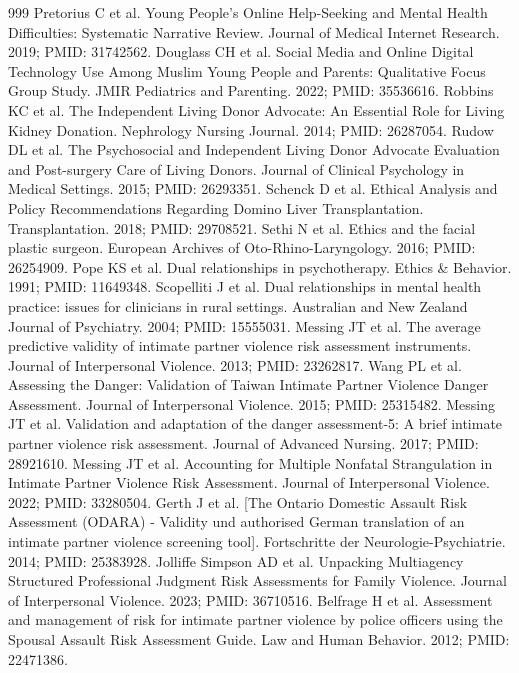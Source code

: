 \begin{thebibliography}{999}
 Pretorius C et al. Young People's Online Help-Seeking and Mental Health Difficulties: Systematic Narrative Review. Journal of Medical Internet Research. 2019; PMID: 31742562.
 Douglass CH et al. Social Media and Online Digital Technology Use Among Muslim Young People and Parents: Qualitative Focus Group Study. JMIR Pediatrics and Parenting. 2022; PMID: 35536616.
 Robbins KC et al. The Independent Living Donor Advocate: An Essential Role for Living Kidney Donation. Nephrology Nursing Journal. 2014; PMID: 26287054.
 Rudow DL et al. The Psychosocial and Independent Living Donor Advocate Evaluation and Post-surgery Care of Living Donors. Journal of Clinical Psychology in Medical Settings. 2015; PMID: 26293351.
 Schenck D et al. Ethical Analysis and Policy Recommendations Regarding Domino Liver Transplantation. Transplantation. 2018; PMID: 29708521.
 Sethi N et al. Ethics and the facial plastic surgeon. European Archives of Oto-Rhino-Laryngology. 2016; PMID: 26254909.
 Pope KS et al. Dual relationships in psychotherapy. Ethics \& Behavior. 1991; PMID: 11649348.
 Scopelliti J et al. Dual relationships in mental health practice: issues for clinicians in rural settings. Australian and New Zealand Journal of Psychiatry. 2004; PMID: 15555031.
 Messing JT et al. The average predictive validity of intimate partner violence risk assessment instruments. Journal of Interpersonal Violence. 2013; PMID: 23262817.
 Wang PL et al. Assessing the Danger: Validation of Taiwan Intimate Partner Violence Danger Assessment. Journal of Interpersonal Violence. 2015; PMID: 25315482.
 Messing JT et al. Validation and adaptation of the danger assessment-5: A brief intimate partner violence risk assessment. Journal of Advanced Nursing. 2017; PMID: 28921610.
 Messing JT et al. Accounting for Multiple Nonfatal Strangulation in Intimate Partner Violence Risk Assessment. Journal of Interpersonal Violence. 2022; PMID: 33280504.
 Gerth J et al. [The Ontario Domestic Assault Risk Assessment (ODARA) - Validity und authorised German translation of an intimate partner violence screening tool]. Fortschritte der Neurologie-Psychiatrie. 2014; PMID: 25383928.
 Jolliffe Simpson AD et al. Unpacking Multiagency Structured Professional Judgment Risk Assessments for Family Violence. Journal of Interpersonal Violence. 2023; PMID: 36710516.
 Belfrage H et al. Assessment and management of risk for intimate partner violence by police officers using the Spousal Assault Risk Assessment Guide. Law and Human Behavior. 2012; PMID: 22471386.

\end{thebibliography}
